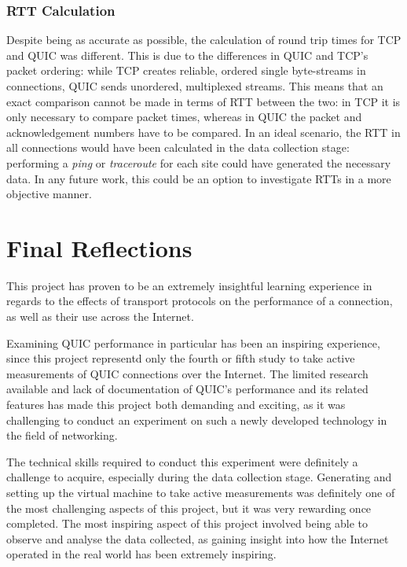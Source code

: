 \documentclass{l4proj}
\begin{document}
\subsubsection{RTT Calculation} Despite being as accurate as possible, the calculation of round trip times for TCP and QUIC was different. This is due to the differences in QUIC and TCP's packet ordering: while TCP creates reliable, ordered single byte-streams in connections, QUIC sends unordered, multiplexed streams. This means that an exact comparison cannot be made in terms of RTT between the two: in TCP it is only necessary to compare packet times, whereas in QUIC the packet and acknowledgement numbers have to be compared. In an ideal scenario, the RTT in all connections would have been calculated in the data collection stage: performing a \emph{ping} or \emph{traceroute} for each site could have generated the necessary data. In any future work, this could be an option to investigate RTTs in a more objective manner.


\section{Final Reflections}

This project has proven to be an extremely insightful learning experience in regards to the effects of transport protocols on the performance of a connection, as well as their use across the Internet. 

Examining QUIC performance in particular has been an inspiring experience, since this project representd only the fourth or fifth study to take active measurements of QUIC connections over the Internet. The limited research available and lack of documentation of QUIC's performance and its related features has made this project both demanding and exciting, as it was challenging to conduct an experiment on such a newly developed technology in the field of networking.

The technical skills required to conduct this experiment were definitely a challenge to acquire, especially during the data collection stage. Generating and setting up the virtual machine to take active measurements was definitely one of the most challenging aspects of this project, but it was very rewarding once completed. The most inspiring aspect of this project involved being able to observe and analyse the data collected, as gaining insight into how the Internet operated in the real world has been extremely inspiring.


\end{document}

